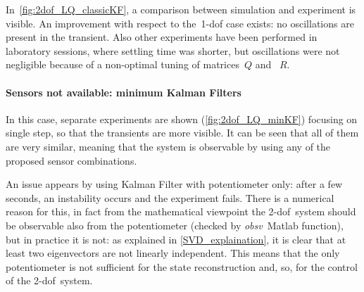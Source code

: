 In~\cref{fig:2dof_LQ_classicKF}, a comparison between simulation and experiment is visible. An improvement with respect to the~\acrshort{1-dof} case exists: no oscillations are present in the transient. Also other experiments have been performed in laboratory sessions, where settling time was shorter, but oscillations were not negligible because of a non-optimal tuning of matrices~$Q$ and ~$R$.

\paragraph{Sensors not available: minimum Kalman Filters}

In this case, separate experiments are shown (\cref{fig:2dof_LQ_minKF}) focusing on single step, so that the transients are more visible. It can be seen that all of them are very similar, meaning that the system is observable by using any of the proposed sensor combinations.

An issue appears by using Kalman Filter with potentiometer only: after a few seconds, an instability occurs and the experiment fails. There is a numerical reason for this, in fact from the mathematical viewpoint the \acrshort{2-dof}~system should be observable also from the potentiometer (checked by \textit{obsv}~Matlab function), but in practice it is not: as explained in \cref{SVD_explaination}, it is clear that at least two eigenvectors are not linearly independent.
This means that the only potentiometer is not sufficient for the state reconstruction and, so, for the control of the \acrshort{2-dof}~system.

